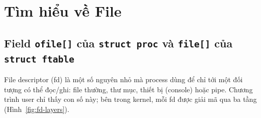 \section{Tìm hiểu về File}

\subsection{Field \texttt{ofile[]} của \texttt{struct proc} và \texttt{file[]} của \texttt{struct ftable}}
\label{sec:ofile-ftable}

File descriptor (fd) là một số nguyên nhỏ mà process dùng để chỉ tới một đối
tượng có thể đọc/ghi: file thường, thư mục, thiết bị (console) hoặc pipe.
Chương trình user chỉ thấy con số này; bên trong kernel, mỗi fd được giải mã
qua ba tầng (Hình~\ref{fig:fd-layers}).

